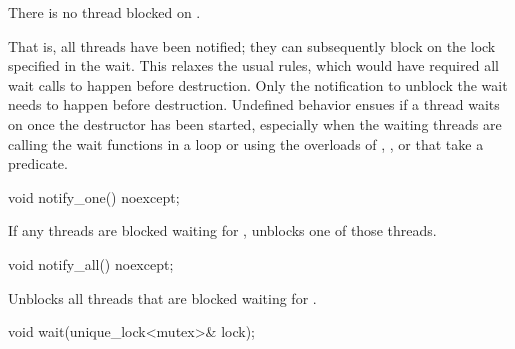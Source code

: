 \begin{itemdescr}
\pnum
\expects
There is no thread blocked on .
\begin{note}
That is, all
threads have been notified; they can subsequently block on the lock specified in the
wait.
This relaxes the usual rules, which would have required all wait calls to happen before
destruction. Only the notification to unblock the wait needs to happen before destruction.
Undefined behavior ensues if a thread waits on  once the destructor has
been started, especially when the waiting threads are calling the wait functions in a loop or
using the overloads of , , or  that take a predicate.
\end{note}
\end{itemdescr}

%
\begin{itemdecl}
void notify_one() noexcept;
\end{itemdecl}

\begin{itemdescr}
\pnum
\effects
If any threads are blocked waiting for , unblocks one of those threads.
\end{itemdescr}

%
\begin{itemdecl}
void notify_all() noexcept;
\end{itemdecl}

\begin{itemdescr}
\pnum
\effects
Unblocks all threads that are blocked waiting for .
\end{itemdescr}

%
\begin{itemdecl}
void wait(unique_lock<mutex>& lock);
\end{itemdecl}

